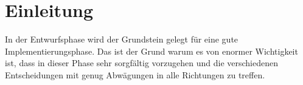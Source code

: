 \section{Einleitung}

In der Entwurfsphase wird der Grundstein gelegt für eine gute Implementierungsphase. Das ist der Grund warum es von enormer Wichtigkeit ist, dass in dieser Phase sehr sorgfältig vorzugehen und die verschiedenen Entscheidungen mit genug Abwägungen in alle Richtungen zu treffen. 